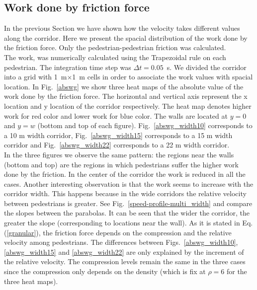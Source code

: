 \subsection{Work done by friction force}

In the previous Section we have shown how the velocity takes different values along the corridor. Here we present the spacial distribution of the work done by the friction force. Only the pedestrian-pedestrian friction was calculated.\\

The work, was numerically calculated using the Trapezoidal rule on each pedestrian. The integration time step was $\Delta t = 0.05$~s. We divided the corridor into a grid with 1~m$\times$1~m cells in order to associate the work values with spacial location. In Fig.~\ref{abswg} we show three heat maps of the absolute value of the work done by the friction force. The horizontal and vertical axis represent the x location and y location of the corridor respectively. The heat map denotes higher work for red color and lower work for blue color. The walls are located at $y=0$ and $y=w$ (bottom and top of each figure). Fig.~\ref{abswg_width10} corresponds to a 10 m width corridor, Fig.~\ref{abswg_width15} corresponds to a 15 m width corridor and Fig.~\ref{abswg_width22} corresponds to a 22 m width corridor.\\

In the three figures we observe the same pattern: the regions near the walls (bottom and top) are the regions in which pedestrians suffer the higher work done by the friction. In the center of the corridor the work is reduced in all the cases. Another interesting observation is that the work seems to increase with the corridor width. This happens because in the wide corridors the relative velocity between pedestrians is greater. See Fig.~\ref{speed-profile-multi_width} and compare the slopes between the parabolas. It can be seen that the wider the corridor, the greater the slope (corresponding to locations near the wall). As it is stated in Eq.(\ref{granular}), the friction force depends on the compression and the relative velocity among pedestrians. The differences between Figs.~\ref{abswg_width10}, \ref{abswg_width15} and  \ref{abswg_width22}  are only explained by the increment of the relative velocity. The compression levels remain the same in the three cases since the compression only depends on the density (which is fix at $\rho=6$ for the three heat maps).\\


